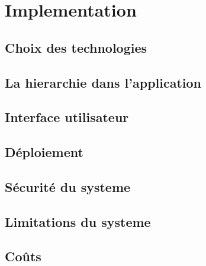 \chapter{Implementation}
        \section{Choix des technologies}
        \lipsum[1]
        \section{La hierarchie dans l'application}
        \lipsum[1]
        \section{Interface utilisateur}
        \lipsum[1]
        \section{Déploiement}
        \lipsum[1]
        \section{Sécurité du systeme}
        \lipsum[1]
        \section{Limitations du systeme}
        \lipsum[1]
        \section{Coûts}
        \lipsum[1]
    